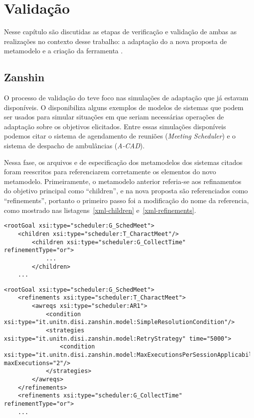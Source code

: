 
\chapter{Validação}
\label{sec-validacao}

Nesse capítulo são discutidas as etapas de verificação e validação de ambas as realizações no contexto desse trabalho: a adaptação do \zanshin a nova proposta de metamodelo e a criação da ferramenta \unagi.

\section{Zanshin}
\label{sec-validacao-zanshin}

O processo de validação do \zanshin teve foco nas simulações de adaptação que já estavam disponíveis. O \framework disponibiliza alguns  exemplos de modelos de sistemas que podem ser usados para simular situações em que  seriam necessárias operações de adaptação sobre os objetivos elicitados. Entre essas simulações disponíveis podemos citar o sistema de agendamento de reuniões (\textit{Meeting Scheduler}) e o sistema de despacho de ambulâncias (\textit{A-CAD}).

Nessa fase, os arquivos \ecore e \xml de especificação dos metamodelos dos sistemas citados foram reescritos para referenciarem corretamente os elementos do novo metamodelo. Primeiramente, o metamodelo anterior referia-se aos refinamentos do objetivo principal como ``children'', e na nova proposta são referenciados como ``refinements'', portanto o primeiro passo foi a modificação do nome da referencia, como mostrado nas listagens~\ref{xml-children} e~\ref{xml-refinements}. 

\begin{lstlisting}[caption={Trecho de XML representando o A-CAD no metamodelo antigo},label={xml-children}]
<rootGoal xsi:type="scheduler:G_SchedMeet">
	<children xsi:type="scheduler:T_CharactMeet"/>
		<children xsi:type="scheduler:G_CollectTime" refinementType="or">
			...
		</children>
	...
\end{lstlisting}

\begin{lstlisting}[caption={Trecho de XML representando o A-CAD no novo metamodelo},label={xml-refinements}]
<rootGoal xsi:type="scheduler:G_SchedMeet">
	<refinements xsi:type="scheduler:T_CharactMeet">
		<awreqs xsi:type="scheduler:AR1">
			<condition xsi:type="it.unitn.disi.zanshin.model:SimpleResolutionCondition"/>
			<strategies xsi:type="it.unitn.disi.zanshin.model:RetryStrategy" time="5000">
				<condition xsi:type="it.unitn.disi.zanshin.model:MaxExecutionsPerSessionApplicabilityCondition" maxExecutions="2"/>
			</strategies>
		</awreqs>
	</refinements>
	<refinements xsi:type="scheduler:G_CollectTime" refinementType="or">
	...
\end{lstlisting}

